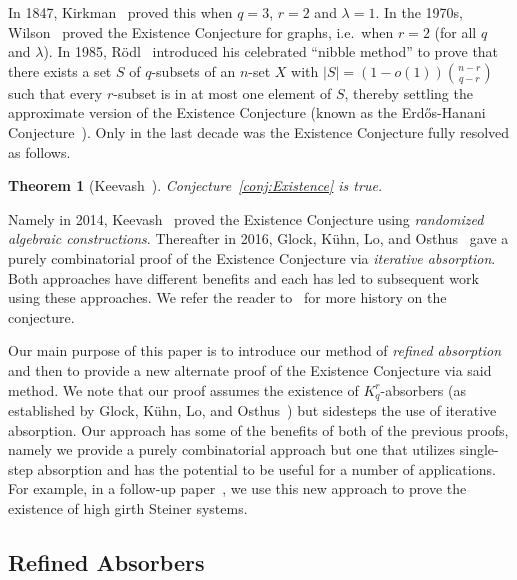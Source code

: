 \documentclass[11pt]{article}
\newcounter{i}
\theoremstyle{plain}
\newtheorem{thm}{Theorem}[section]
\theoremstyle{plain} %
\theoremstyle{definition}
\begin{document}
In 1847, Kirkman~\cite{K47} proved this when $q=3$, $r=2$ and $\lambda=1$. In the 1970s, Wilson~\cite{WI, WII, WIII} proved the Existence Conjecture for graphs, i.e.~when $r=2$ (for all $q$ and $\lambda$). In 1985, R\"{o}dl~\cite{R85} introduced his celebrated ``nibble method'' to prove that there exists a set $S$ of $q$-subsets of an $n$-set $X$ with $|S| = (1-o(1))\binom{n-r}{q-r}$ such that every $r$-subset is in at most one element of $S$, thereby settling the approximate version of the Existence Conjecture (known as the Erd\H{o}s-Hanani Conjecture~\cite{EH63}). Only in the last decade was the Existence Conjecture fully resolved as follows.

\begin{thm}[Keevash~\cite{K14}]\label{thm:Existence}
Conjecture~\ref{conj:Existence} is true.   
\end{thm}

Namely in 2014, Keevash~\cite{K14} proved the Existence Conjecture using \emph{randomized algebraic constructions}. Thereafter in 2016, Glock, K\"{u}hn, Lo, and Osthus~\cite{GKLO16} gave a purely combinatorial proof of the Existence Conjecture via \emph{iterative absorption}. Both approaches have different benefits and each has led to subsequent work using these approaches. We refer the reader to~\cite{W03, K14, GKLO16} for more history on the conjecture.

Our main purpose of this paper is to introduce our method of \emph{refined absorption} and then to provide a new alternate proof of the Existence Conjecture via said method.  We note that our proof assumes the existence of $K_q^r$-absorbers (as established by Glock, K\"{u}hn, Lo, and Osthus~\cite{GKLO16}) but sidesteps the use of iterative absorption. Our approach has some of the benefits of both of the previous proofs, namely we provide a purely combinatorial approach but one that utilizes single-step absorption and has the potential to be useful for a number of applications. For example, in a follow-up paper~\cite{DPII}, we use this new approach to prove the existence of high girth Steiner systems.

\subsection{Refined Absorbers}
\end{document}
